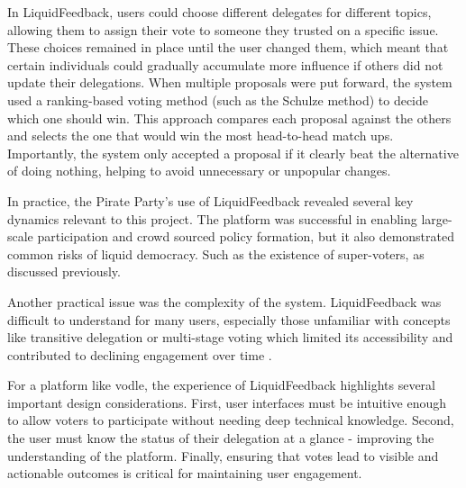 In LiquidFeedback, users could choose different delegates for different topics, allowing them to assign their vote to someone they trusted on a specific issue. These choices remained in place until the user changed them, which meant that certain individuals could gradually accumulate more influence if others did not update their delegations. When multiple proposals were put forward, the system used a ranking-based voting method (such as the Schulze method) to decide which one should win. This approach compares each proposal against the others and selects the one that would win the most head-to-head match ups. Importantly, the system only accepted a proposal if it clearly beat the alternative of doing nothing, helping to avoid unnecessary or unpopular changes.

In practice, the Pirate Party's use of LiquidFeedback revealed several key dynamics relevant to this project. The platform was successful in enabling large-scale participation and crowd sourced policy formation, but it also demonstrated common risks of liquid democracy. Such as the existence of super-voters, as discussed previously.

Another practical issue was the complexity of the system. LiquidFeedback was difficult to understand for many users, especially those unfamiliar with concepts like transitive delegation or multi-stage voting which limited its accessibility and contributed to declining engagement over time \citep{kling2015votingbehaviourpoweronline}.

For a platform like vodle, the experience of LiquidFeedback highlights several important design considerations. First, user interfaces must be intuitive enough to allow voters to participate without needing deep technical knowledge. Second, the user must know the status of their delegation at a glance - improving the understanding of the platform. Finally, ensuring that votes lead to visible and actionable outcomes is critical for maintaining user engagement.

